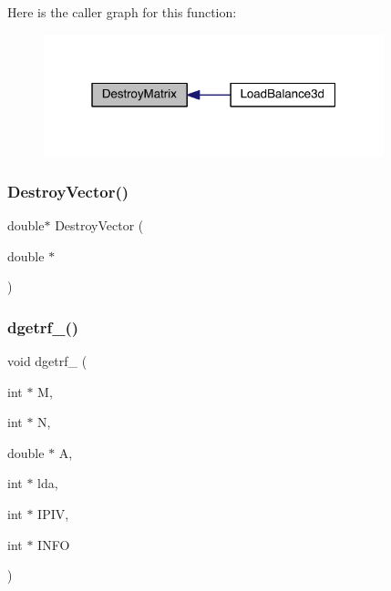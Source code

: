 Here is the caller graph for this function\+:\nopagebreak
\begin{figure}[H]
\begin{center}
\leavevmode
\includegraphics[width=280pt]{a00554_afa534e284e3bdd83ec70e03b3348d960_icgraph}
\end{center}
\end{figure}
\mbox{\label{a00554_a6d2c56d5886407db34f7810cd4ebb1ac}} 
\subsubsection{\texorpdfstring{Destroy\+Vector()}{DestroyVector()}}
{\footnotesize\ttfamily double$\ast$ Destroy\+Vector (\begin{DoxyParamCaption}\item[{double $\ast$}]{ }\end{DoxyParamCaption})}

\mbox{\label{a00554_a9ade98d71580bb70e0ddf663d30e4bb4}} 
\subsubsection{\texorpdfstring{dgetrf\+\_\+()}{dgetrf\_()}}
{\footnotesize\ttfamily void dgetrf\+\_\+ (\begin{DoxyParamCaption}\item[{int $\ast$}]{M,  }\item[{int $\ast$}]{N,  }\item[{double $\ast$}]{A,  }\item[{int $\ast$}]{lda,  }\item[{int $\ast$}]{I\+P\+IV,  }\item[{int $\ast$}]{I\+N\+FO }\end{DoxyParamCaption})}

\mbox{\label{a00554_af83709f5dcd4b9fbff71c3623b64fa21}} 
